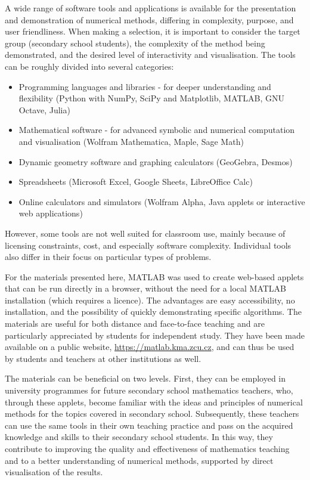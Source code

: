 \documentclass[a4paper,12pt]{article}
\begin{document}
A wide range of software tools and applications is available for the presentation and demonstration of numerical methods, differing in complexity, purpose, and user friendliness. When making a selection, it is important to consider the target group (secondary school students), the complexity of the method being demonstrated, and the desired level of interactivity and visualisation. The tools can be roughly divided into several categories:
\begin{itemize}
\item Programming languages and libraries - for deeper understanding and flexibility (Python with NumPy, SciPy and Matplotlib, MATLAB, GNU Octave, Julia)
\item Mathematical software - for advanced symbolic and numerical computation and visualisation (Wolfram Mathematica, Maple, Sage Math)
\item Dynamic geometry software and graphing calculators (GeoGebra, Desmos)  
\item Spreadsheets (Microsoft Excel, Google Sheets, LibreOffice Calc)
\item Online calculators and simulators (Wolfram Alpha, Java applets or interactive web applications)
\end{itemize}
However, some tools are not well suited for classroom use, mainly because of licensing constraints, cost, and especially software complexity. Individual tools also differ in their focus on particular types of problems.

For the materials presented here, MATLAB was used to create web-based applets that can be run directly in a browser, without the need for a local MATLAB installation (which requires a licence). The advantages are easy accessibility, no installation, and the possibility of quickly demonstrating specific algorithms. The materials are useful for both distance and face-to-face teaching and are particularly appreciated by students for independent study. They have been made available on a public website, 
\href{https://matlab.kma.zcu.cz}{https://matlab.kma.zcu.cz}, and can thus be used by students and teachers at other institutions as well.

The materials can be beneficial on two levels. First, they can be employed in university programmes for future secondary school mathematics teachers, who, through these applets, become familiar with the ideas and principles of numerical methods for the topics covered in secondary school. Subsequently, these teachers can use the same tools in their own teaching practice and pass on the acquired knowledge and skills to their secondary school students. In this way, they contribute to improving the quality and effectiveness of mathematics teaching and to a better understanding of numerical methods, supported by direct visualisation of the results.
 
\end{document}

